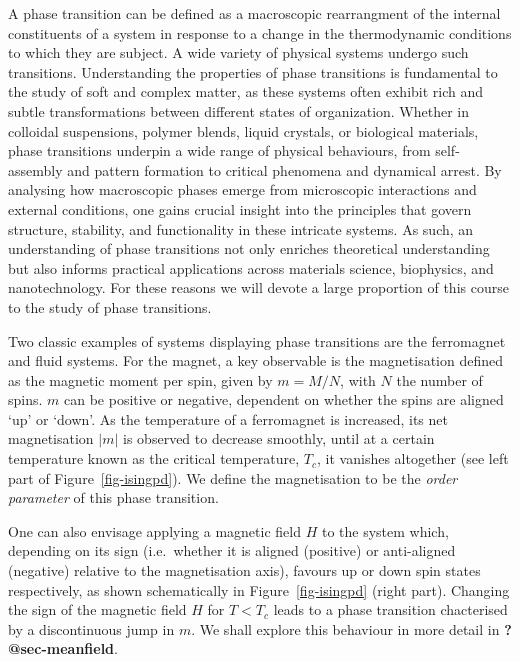 \documentclass[
  letterpaper,
  DIV=11,
  numbers=noendperiod]{scrreprt}
\begin{document}
A phase transition can be defined as a macroscopic rearrangment of the
internal constituents of a system in response to a change in the
thermodynamic conditions to which they are subject. A wide variety of
physical systems undergo such transitions. Understanding the properties
of phase transitions is fundamental to the study of soft and complex
matter, as these systems often exhibit rich and subtle transformations
between different states of organization. Whether in colloidal
suspensions, polymer blends, liquid crystals, or biological materials,
phase transitions underpin a wide range of physical behaviours, from
self-assembly and pattern formation to critical phenomena and dynamical
arrest. By analysing how macroscopic phases emerge from microscopic
interactions and external conditions, one gains crucial insight into the
principles that govern structure, stability, and functionality in these
intricate systems. As such, an understanding of phase transitions not
only enriches theoretical understanding but also informs practical
applications across materials science, biophysics, and nanotechnology.
For these reasons we will devote a large proportion of this course to
the study of phase transitions.

Two classic examples of systems displaying phase transitions are the
ferromagnet and fluid systems. For the magnet, a key observable is the
magnetisation defined as the magnetic moment per spin, given by
\(m=M/N\), with \(N\) the number of spins. \(m\) can be positive or
negative, dependent on whether the spins are aligned `up' or `down'. As
the temperature of a ferromagnet is increased, its net magnetisation
\(|m|\) is observed to decrease smoothly, until at a certain temperature
known as the critical temperature, \(T_c\), it vanishes altogether (see
left part of Figure~\ref{fig-isingpd}). We define the magnetisation to
be the \emph{order parameter} of this phase transition.

One can also envisage applying a magnetic field \(H\) to the system
which, depending on its sign (i.e.~whether it is aligned (positive) or
anti-aligned (negative) relative to the magnetisation axis), favours up
or down spin states respectively, as shown schematically in
Figure~\ref{fig-isingpd} (right part). Changing the sign of the magnetic
field \(H\) for \(T<T_c\) leads to a phase transition chacterised by a
discontinuous jump in \(m\). We shall explore this behaviour in more
detail in \textbf{?@sec-meanfield}.
\end{document}
